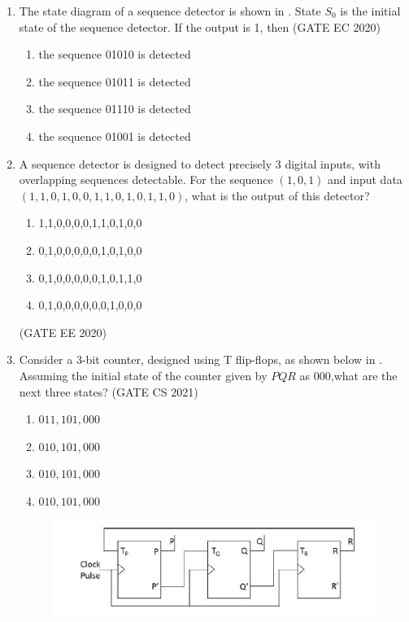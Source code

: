 \begin{enumerate}[label=\arabic*.,ref=\theenumi]
\item 	The state diagram of a sequence detector is shown in
  .
		 State $S_0$ is the initial state of the sequence detector. If the output is 1, then
\hfill (GATE EC 2020)
\begin{enumerate}
 \item the sequence 01010 is detected
 \item the sequence 01011 is detected
 \item the sequence 01110 is detected
 \item the sequence 01001 is detected	 
\end{enumerate}	
	\begin{figure}[H]
    \centering
    \resizebox{0.75\columnwidth}{!}{%
  
		}
  \caption{}
  \label{fig:gate/ec/2020/39/1}		
  \end{figure}	 
\item A sequence detector is designed to detect precisely 3 digital inputs, with overlapping sequences detectable. For the sequence $(1,0,1)$ and input data $(1,1,0,1,0,0,1,1,0,1,0,1,1,0)$, what is the output of this detector?
		\begin{enumerate}
			\item 1,1,0,0,0,0,1,1,0,1,0,0
			\item 0,1,0,0,0,0,0,1,0,1,0,0
			\item 0,1,0,0,0,0,0,1,0,1,1,0
			\item 0,1,0,0,0,0,0,0,1,0,0,0
		\end{enumerate}
		\hfill (GATE EE 2020)
\item Consider a $3$-bit counter, designed using T flip-flops, as shown below
in .
Assuming the initial state of the counter given by $PQR$ as $000$,what are the next three states?
                 \hfill(GATE CS 2021)
\begin{enumerate}
\item $011, 101, 000$
\item $010, 101, 000$
\item $010, 101, 000$
\item $010, 101, 000$
\end{enumerate}
     \begin{figure}[H]
\centering
\includegraphics[width=0.75\columnwidth]{ide/fsm/figs/3bitcounter.jpg}

\end{figure}
\end{enumerate}
